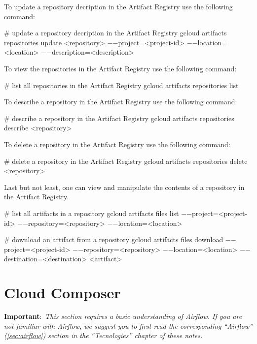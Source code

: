 To update a repository decription in the Artifact Registry use the following command:
\begin{bash}
# update a repository decription in the Artifact Registry
gcloud artifacts repositories update <repository>
    $-$$-$project=<project-id>
    $-$$-$location=<location>
    $-$$-$description=<description>
\end{bash}

To view the repositories in the Artifact Registry use the following command:
\begin{bash}
# list all repositories in the Artifact Registry
gcloud artifacts repositories list
\end{bash}

To describe a repository in the Artifact Registry use the following command:
\begin{bash}
# describe a repository in the Artifact Registry
gcloud artifacts repositories describe <repository>
\end{bash}

To delete a repository in the Artifact Registry use the following command:
\begin{bash}
# delete a repository in the Artifact Registry
gcloud artifacts repositories delete <repository>
\end{bash}

Last but not least, one can view and manipulate the contents of a repository in the Artifact Registry.

\begin{bash}
# list all artifacts in a repository
gcloud artifacts files list
    $-$$-$project=<project-id>
    $-$$-$repository=<repository>
    $-$$-$location=<location>
\end{bash}

\begin{bash}
# download an artifact from a repository
gcloud artifacts files download
    $-$$-$project=<project-id>
    $-$$-$repository=<repository>
    $-$$-$location=<location>
    $-$$-$destination=<destination>
    <artifact>
\end{bash}

\section{Cloud Composer}

\textbf{Important}:~\textit{This section requires a basic understanding of Airflow. If you are not familiar with
Airflow, we suggest you to first read the corresponding ``Airflow'' (\ref{sec:airflow}) section in the ``Tecnologies''
chapter of these notes.}

